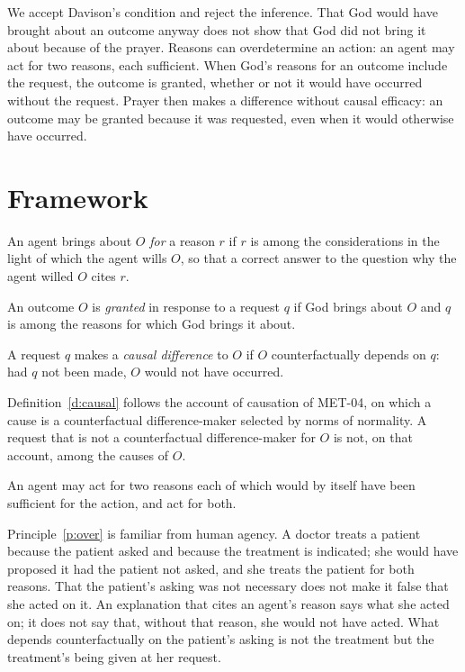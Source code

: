 \documentclass{situationist-preprint}
\begin{document}
We accept Davison's condition and reject the inference. That God would have brought about an outcome anyway does not show that God did not bring it about because of the prayer. Reasons can overdetermine an action: an agent may act for two reasons, each sufficient. When God's reasons for an outcome include the request, the outcome is granted, whether or not it would have occurred without the request. Prayer then makes a difference without causal efficacy: an outcome may be granted because it was requested, even when it would otherwise have occurred.

\section{Framework}

\begin{definition}\label{d:for}
An agent brings about $O$ \emph{for} a reason $r$ if $r$ is among the considerations in the light of which the agent wills $O$, so that a correct answer to the question why the agent willed $O$ cites $r$.
\end{definition}

\begin{definition}[Granting]\label{d:grant}
An outcome $O$ is \emph{granted} in response to a request $q$ if God brings about $O$ and $q$ is among the reasons for which God brings it about.
\end{definition}

\begin{definition}\label{d:causal}
A request $q$ makes a \emph{causal difference} to $O$ if $O$ counterfactually depends on $q$: had $q$ not been made, $O$ would not have occurred.
\end{definition}

Definition~\ref{d:causal} follows the account of causation of MET-04, on which a cause is a counterfactual difference-maker selected by norms of normality. A request that is not a counterfactual difference-maker for $O$ is not, on that account, among the causes of $O$.

\begin{principle}\label{p:over}
An agent may act for two reasons each of which would by itself have been sufficient for the action, and act for both.
\end{principle}

Principle~\ref{p:over} is familiar from human agency. A doctor treats a patient because the patient asked and because the treatment is indicated; she would have proposed it had the patient not asked, and she treats the patient for both reasons. That the patient's asking was not necessary does not make it false that she acted on it. An explanation that cites an agent's reason says what she acted on; it does not say that, without that reason, she would not have acted. What depends counterfactually on the patient's asking is not the treatment but the treatment's being given at her request.
\end{document}
